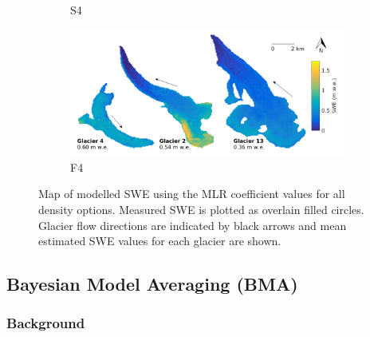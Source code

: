 \documentclass{sfuthesis}
\begin{document}
\begin{figure}[H]
\begin{subfigure}[b]{0.475\textwidth}
            \caption[]%
            {{\small S4}}    
        \end{subfigure}
        \quad
        \begin{subfigure}[b]{0.475\textwidth}   
            \centering 
            \includegraphics[width=\textwidth]{MLRmap_Modelled_Observed8.png}
            \caption[]%
            {{\small F4}}    
        \end{subfigure}
        
        \caption[Map of modelled SWE using the MLR coefficient values for all density options. Measured SWE is plotted as overlain filled circles. Glacier flow directions are indicated by black arrows and mean estimated SWE values for each glacier are shown.]
        {\small Map of modelled SWE using the MLR coefficient values for all density options. Measured SWE is plotted as overlain filled circles. Glacier flow directions are indicated by black arrows and mean estimated SWE values for each glacier are shown.} 
        \label{fig:allMLRmodelled}
    \end{figure}
    



\subsection{Bayesian Model Averaging (BMA)}
\label{sec:BMS}

\subsubsection{Background}
\end{document}
